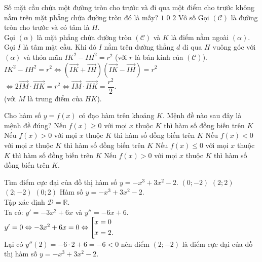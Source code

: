 \begin{ex}%
 Số mặt cầu chứa một đường tròn cho trước và đi qua một điểm cho trước không nằm trên mặt phẳng chứa đường tròn đó là mấy?
 \choice
  {\True $1$}
  {$0$}
  {$2$}
  {Vô số}
 \loigiai
  {
  Gọi $(\mathscr{C})$ là đường tròn cho trước và có tâm là $H$.\\
  Gọi $(\alpha)$ là mặt phẳng chứa đường tròn $(\mathscr{C})$ và $K$ là điểm nằm ngoài $(\alpha)$.\\
  Gọi $I$ là tâm mặt cầu. Khi đó $I$ nằm trên đường thẳng $d$ đi qua $H$ vuông góc với $(\alpha)$ và thỏa mãn $IK^2 - IH^2 = r^2$ (với $r$ là bán kính của $(\mathscr{C})$).\\
  $IK^2 - IH^2 = r^2 \Leftrightarrow \left(\vec{IK} + \vec{IH}\right) \left(\vec{IK} - \vec{IH}\right) = r^2$\\
  $\Leftrightarrow 2\vec{IM} \cdot \vec{HK} = r^2 \Leftrightarrow \vec{IM} \cdot \vec{HK} = \dfrac{r^2}{2}$.\\ (với $M$ là trung điểm của $HK$).\\ 
  }
\end{ex}


\begin{ex}%
 Cho hàm số $y = f(x)$ có đạo hàm trên khoảng $K$. Mệnh đề nào sau đây là mệnh đề đúng?
 \choice
  {Nếu $f(x) \geq 0$ với mọi $x$ thuộc $K$ thì hàm số đồng biến trên $K$}
  {\True Nếu $f(x) > 0$ với mọi $x$ thuộc $K$ thì hàm số đồng biến trên $K$}
  {Nếu $f(x) < 0$ với mọi $x$ thuộc $K$ thì hàm số đồng biến trên $K$}
  {Nếu $f(x) \leq 0$ với mọi $x$ thuộc $K$ thì hàm số đồng biến trên $K$}
 \loigiai
  {
 Nếu $f(x) > 0$ với mọi $x$ thuộc $K$ thì hàm số đồng biến trên $K$. 
  }
\end{ex}


\begin{ex}%
 Tìm điểm cực đại của đồ thị hàm số $y = -x^3+3x^2-2$.
 \choice
  {$(0;-2)$}
  {\True $(2;2)$}
  {$(2;-2)$}
  {$(0;2)$}
 \loigiai
  {
  Hàm số $y = -x^3+3x^2-2$.\\
  Tập xác định $\mathscr{D} = \mathbb{R}$.\\
  Ta có: $y' = -3x^2 + 6x$ và $y'' = -6x + 6$.\\
  $y' = 0 \Leftrightarrow -3x^2 + 6x = 0 \Leftrightarrow \left[\begin{aligned}& x = 0 \\& x = 2.\end{aligned}\right.$\\
  Lại có $y''(2) = -6 \cdot 2 + 6 = -6 < 0$ nên điểm $(2;-2)$ là điểm cực đại của đồ thị hàm số $y = -x^3+3x^2-2$.
  }
\end{ex}



